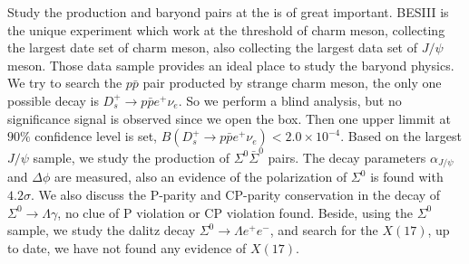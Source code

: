 
\begin{eabstract} 
    Study the production and baryond pairs at the is of great important. BESIII is the unique experiment 
    which work at the threshold of charm meson, collecting the largest date set of charm meson, also 
   collecting the largest data set of $J/\psi$ meson. Those data sample provides an ideal place to study the baryond
   physics.  We try to search the $p\bar{p}$ pair producted by strange charm meson, the only one possible decay is 
   $D_{s}^{+} \to p \bar{p} e^{+} \nu_{e}$. So we perform a blind analysis, but no significance signal is observed since 
    we open the box. Then one upper limmit at $90\%$ confidence level is set, 
   $B(D_{s}^{+} \to p \bar{p} e^{+} \nu_{e}) < 2.0 \times 10^{-4} $.  Based on the largest $J/\psi$ sample, we study the 
   production of  $\Sigma^{0}\bar{\Sigma}^{0}$ pairs. The decay parameters $\alpha_{J/\psi}$ and $\Delta \phi$ are       measured, also an evidence of the polarization of  $\Sigma^{0}$ is found with $4.2 \sigma$. We also discuss the P-parity
   and CP-parity conservation in the decay of $\Sigma^{0} \to \Lambda \gamma$, no clue of P violation or CP violation found. Beside, using the $\Sigma^{0}$ sample, we study the dalitz decay $\Sigma^{0} \to \Lambda e^{+} e^{-}$, and 
  search for the $X(17)$, up to date, we have not found any evidence of $X(17)$. 

\end{eabstract}

